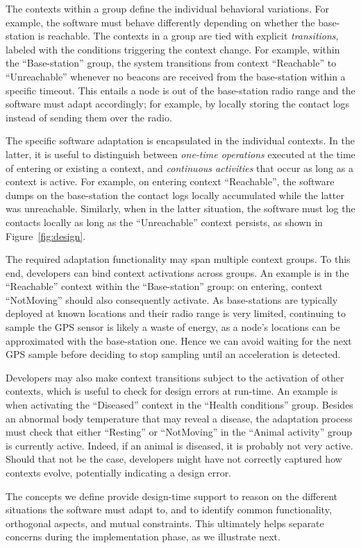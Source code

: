 The contexts within a group define the individual behavioral
variations. For example, the software must behave differently
depending on whether the base-station is reachable.  The contexts in a
group are tied with explicit \emph{transitions}, labeled with the
conditions triggering the context change. For example, within the
``Base-station'' group, the system transitions from context
``Reachable'' to ``Unreachable'' whenever no beacons are received from
the base-station within a specific timeout. This entails a node is out
of the base-station radio range and the software must adapt
accordingly; for example, by locally storing the contact logs instead
of sending them over the radio.

The specific software adaptation is encapsulated in the individual
contexts. In the latter, it is useful to distinguish between \emph{one-time
  operations} executed at the time of entering or existing a context,
and \emph{continuous activities} that occur as long as a context is
active. For example, on entering context ``Reachable'', the software
dumps on the base-station the contact logs locally accumulated while
the latter was unreachable. Similarly, when in the latter situation,
the software must log the contacts locally as long as the
``Unreachable'' context persists, as shown in Figure~\ref{fig:design}.

The required adaptation functionality may span multiple context
groups. To this end, developers can bind context activations across
groups. An example is in the ``Reachable'' context within the
``Base-station'' group: on entering, context ``NotMoving'' should
also consequently activate. As base-stations are typically deployed at
known locations and their radio range is very limited, continuing
to sample the GPS sensor is likely a waste of energy, as a node's
locations can be approximated with the base-station one. Hence we can
avoid waiting for the next GPS sample before deciding to stop
sampling until an acceleration is detected.

Developers may also make context transitions subject to the activation
of other contexts, which is useful to check for design errors at
run-time. An example is when activating the ``Diseased'' context in
the ``Health conditions'' group. Besides an abnormal body temperature
that may reveal a disease, the adaptation process must check that
either ``Resting'' or ``NotMoving'' in the ``Animal activity'' group
is currently active. Indeed, if an animal is diseased, it is probably
not very active. Should that not be the case, developers might have
not correctly captured how contexts evolve, potentially indicating a
design error.

The concepts we define provide design-time support to reason on the
different situations the software must adapt to, and to identify common
functionality, orthogonal aspects, and mutual constraints. This
ultimately helps separate concerns during the implementation phase, as
we illustrate next.



